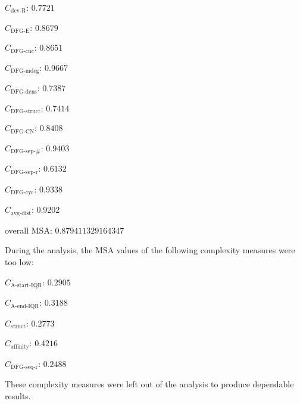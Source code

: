 \documentclass[a4paper]{article}
\newcommand{\startiqrname}{\text{A-start-IQR}}
\newcommand{\startiqr}{C_{\startiqrname}}
\newcommand{\lastiqrname}{\text{A-end-IQR}}
\newcommand{\lastiqr}{C_{\lastiqrname}}
\newcommand{\dfgedgesname}{\text{DFG-E}}
\newcommand{\dfgedges}{C_{\dfgedgesname}}
\newcommand{\dfgcncname}{\text{DFG-cnc}}
\newcommand{\dfgcnc}{C_{\dfgcncname}}
\newcommand{\dfgmaxdegname}{\text{DFG-mdeg}}
\newcommand{\dfgmaxdeg}{C_{\dfgmaxdegname}}
\newcommand{\dfgdensname}{\text{DFG-dens}}
\newcommand{\dfgdens}{C_{\dfgdensname}}
\newcommand{\dfgstructname}{\text{DFG-struct}}
\newcommand{\dfgstruct}{C_{\dfgstructname}}
\newcommand{\dfgcycnumbername}{\text{DFG-CN}}
\newcommand{\dfgcycnumber}{C_{\dfgcycnumbername}}
\newcommand{\dfgsepnumname}{\text{DFG-sep-\#}}
\newcommand{\dfgsepnum}{C_{\dfgsepnumname}}
\newcommand{\dfgseprationame}{\text{DFG-sep-r}}
\newcommand{\dfgsepratio}{C_{\dfgseprationame}}
\newcommand{\dfgseqrationame}{\text{DFG-seq-r}}
\newcommand{\dfgseqratio}{C_{\dfgseqrationame}}
\newcommand{\dfgcycname}{\text{DFG-cyc}}
\newcommand{\dfgcyc}{C_{\dfgcycname}}
\newcommand{\structurename}{\text{struct}}
\newcommand{\structure}{C_{\structurename}}
\newcommand{\affinityname}{\text{affinity}}
\newcommand{\affinity}{C_{\affinityname}}
\newcommand{\deviationfromrandomname}{\text{dev-R}}
\newcommand{\deviationfromrandom}{C_{\deviationfromrandomname}}
\newcommand{\avgdistname}{\text{avg-dist}}
\newcommand{\avgdist}{C_{\avgdistname}}
\begin{document}
\begin{compactitem}
\item $\deviationfromrandom$: $0.7721$
\item $\dfgedges$: $0.8679$
\item $\dfgcnc$: $0.8651$
\item $\dfgmaxdeg$: $0.9667$
\item $\dfgdens$: $0.7387$
\item $\dfgstruct$: $0.7414$
\item $\dfgcycnumber$: $0.8408$
\item $\dfgsepnum$: $0.9403$
\item $\dfgsepratio$: $0.6132$
\item $\dfgcyc$: $0.9338$
\item $\avgdist$: $0.9202$
\item overall MSA: $0.879411329164347$
\end{compactitem}

\bigskip
\noindent
During the analysis, the MSA values of the following complexity measures were too low:
\begin{compactitem}
\item $\startiqr$: $0.2905$
\item $\lastiqr$: $0.3188$
\item $\structure$: $0.2773$
\item $\affinity$: $0.4216$
\item $\dfgseqratio$: $0.2488$
\end{compactitem}
These complexity measures were left out of the analysis to produce dependable results.
\end{document}
